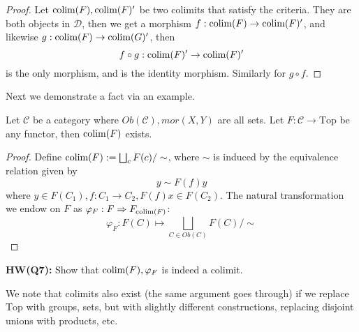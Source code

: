 \begin{proof}
    Let $\text{colim}(F), \text{colim}(F)'$ be two colimits that satisfy the criteria. They are both objects in $\mathcal{D}$, then we get a morphism $f:\text{colim}(F)\to\text{colim}(F)'$, and likewise $g:\text{colim}(F)\to\text{colim}(G)'$, then
    \begin{equation*}
        f\circ g:\text{colim}(F)'\to\text{colim}(F)'
    \end{equation*} 
    is the only morphism, and is the identity morphism. Similarly for $g\circ f$.
\end{proof}
Next we demonstrate a fact via an example.
\begin{thm}
    Let $\mathcal{C}$ be a category where $Ob(\mathcal{C}), mor(X,Y)$ are all sets. Let $F: \mathcal{C}\to\text{Top}$ be any functor, then $\text{colim}(F)$ exists.
\end{thm}
\begin{proof}
    Define $\text{colim}(F):=\bigsqcup_{c}F(c)/\sim$, where $\sim$ is induced by the equivalence relation given by 
    \begin{equation*}
        y\sim F(f)y
    \end{equation*}
    where $y\in F(C_1), f:C_1\to C_2, F(f)x\in F(C_2)$. The natural transformation we endow on $F$ as $\varphi_F:F\Rightarrow F_{\text{colim}(F)}$:
    \begin{equation*}
        \varphi_F: F(C)\mapsto \bigsqcup_{C\in Ob(C)}F(C)/\sim
    \end{equation*}
\end{proof}
\begin{prob}
    \textbf{HW(Q7):} Show that $\text{colim}(F), \varphi_F$ is indeed a colimit. 
\end{prob}
We note that colimits also exist (the same argument goes through) if we replace $\text{Top}$ with groups, sets, but with slightly different constructions, replacing disjoint unions with products, etc.

